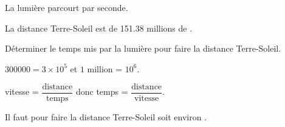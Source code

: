     La lumière parcourt  par seconde.

    La distance Terre-Soleil est de \num{151.38} millions de \Lg[km]{}.

    \medskip
    Déterminer le temps mis par la lumière pour faire la distance Terre-Soleil.

    {\red $\num{300000}=3\times 10^5$ et $1$ million = $10^6$.

    vitesse = $\dfrac{\text{distance}}{\text{temps}}$ donc temps = $\dfrac{\text{distance}}{\text{vitesse}}$.

    Il faut  pour faire la distance Terre-Soleil soit environ .
    }
